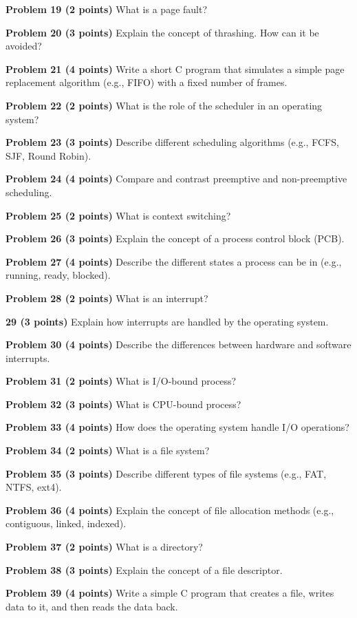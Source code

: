 \documentclass{article}
\begin{document}
\textbf{Problem 19 (2 points)} What is a page fault?


\textbf{Problem 20 (3 points)} Explain the concept of thrashing. How can it be avoided?


\textbf{Problem 21 (4 points)} Write a short C program that simulates a simple page replacement algorithm (e.g., FIFO) with a fixed number of frames.


\textbf{Problem 22 (2 points)} What is the role of the scheduler in an operating system?


\textbf{Problem 23 (3 points)} Describe different scheduling algorithms (e.g., FCFS, SJF, Round Robin).


\textbf{Problem 24 (4 points)} Compare and contrast preemptive and non-preemptive scheduling.


\textbf{Problem 25 (2 points)} What is context switching?


\textbf{Problem 26 (3 points)} Explain the concept of a process control block (PCB).


\textbf{Problem 27 (4 points)} Describe the different states a process can be in (e.g., running, ready, blocked).


\textbf{Problem 28 (2 points)} What is an interrupt?


\textbf{29 (3 points)} Explain how interrupts are handled by the operating system.


\textbf{Problem 30 (4 points)}  Describe the differences between hardware and software interrupts.


\textbf{Problem 31 (2 points)} What is I/O-bound process?


\textbf{Problem 32 (3 points)} What is CPU-bound process?


\textbf{Problem 33 (4 points)} How does the operating system handle I/O operations?


\textbf{Problem 34 (2 points)} What is a file system?


\textbf{Problem 35 (3 points)} Describe different types of file systems (e.g., FAT, NTFS, ext4).


\textbf{Problem 36 (4 points)}  Explain the concept of file allocation methods (e.g., contiguous, linked, indexed).


\textbf{Problem 37 (2 points)} What is a directory?


\textbf{Problem 38 (3 points)} Explain the concept of a file descriptor.


\textbf{Problem 39 (4 points)} Write a simple C program that creates a file, writes data to it, and then reads the data back.
\end{document}
